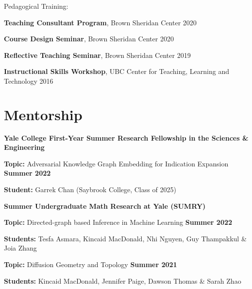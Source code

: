 \documentclass[margin,line]{res}
\newenvironment{list1}{
  \begin{list}{\ding{113}}{
      \setlength{\itemsep}{0in}
      \setlength{\parsep}{0in} \setlength{\parskip}{0in}
      \setlength{\topsep}{0in} \setlength{\partopsep}{0in}
      \setlength{\leftmargin}{0.17in}}}{\end{list}}
\begin{document}
\begin{resume}
Pedagogical Training:
\vspace*{.2cm}

\begin{list1}
\setlength\itemsep{0.25em}
\item[] {\bf Teaching Consultant Program}, Brown Sheridan Center \hfill 2020
\item[] {\bf Course Design Seminar}, Brown Sheridan Center \hfill 2020
\item[] {\bf Reflective Teaching Seminar}, Brown Sheridan Center \hfill 2019
\item[] {\bf Instructional Skills Workshop}, UBC Center for Teaching, Learning and Technology \hfill 2016
\end{list1} 

\vspace*{.2cm}

\section{\sc Mentorship}

{\bf Yale College First-Year Summer Research Fellowship in the Sciences \& Engineering}
\vspace*{.3cm}
\begin{list1}
\setlength\itemsep{0.2em}
\item[] {\bf Topic:} Adversarial Knowledge Graph Embedding for Indication Expansion \hfill {\bf Summer 2022}
\item[] {\bf Student:} Garrek Chan (Saybrook College, Class of 2025) 
\end{list1}

{\bf Summer Undergraduate Math Research at Yale (SUMRY)}
\vspace*{.3cm}
\begin{list1}
\setlength\itemsep{0.2em}
\item[] {\bf Topic:} Directed-graph based Inference in Machine Learning \hfill {\bf Summer 2022}
\item[] {\bf Students:} Tesfa Asmara, Kincaid MacDonald, Nhi Nguyen, Guy Thampakkul \& Joia Zhang 
\end{list1}
\vspace*{.3cm}
\begin{list1}
\setlength\itemsep{0.2em}
\item[] {\bf Topic:} Diffusion Geometry and Topology \hfill {\bf Summer 2021}
\item[] {\bf Students:} Kincaid MacDonald, Jennifer Paige, Dawson Thomas \& Sarah Zhao
\end{list1}


\end{resume}
\end{document}

